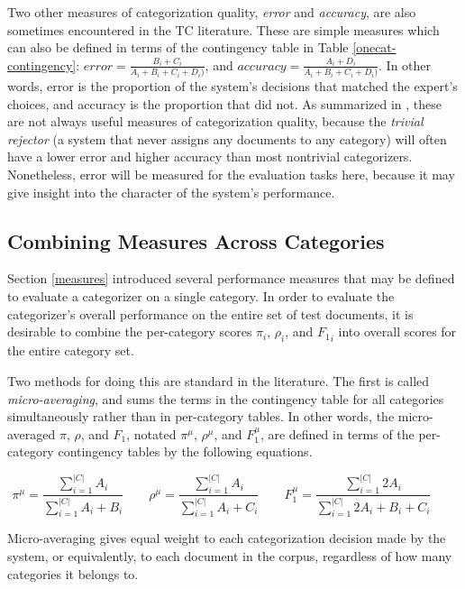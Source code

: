 Two other measures of categorization quality, \emph{error} and
\emph{accuracy}, are also sometimes encountered in the TC literature.
These are simple measures which can also be defined in terms of the
contingency table in Table \ref{onecat-contingency}: $error =
\frac{B_i+C_i}{A_i+B_i+C_i+D_i)}$, and $accuracy =
\frac{A_i+D_i}{A_i+B_i+C_i+D_i)}$.  In other words, error is the
proportion of the system's decisions that matched the expert's
choices, and accuracy is the proportion that did not.  As summarized
in \cite[p. 34]{sebastiani:02}, these are not always useful measures
of categorization quality, because the \emph{trivial rejector} (a
system that never assigns any documents to any category) will often
have a lower error and higher accuracy than most nontrivial
categorizers.  Nonetheless, error will be measured for the evaluation
tasks here, because it may give insight into the character of the
system's performance.


\subsection{Combining Measures Across Categories}
\label{combining-measures}

Section \ref{measures} introduced several performance measures that
may be defined to evaluate a categorizer on a single category.  In
order to evaluate the categorizer's overall performance on the entire
set of test documents, it is desirable to combine the per-category
scores $\pi_i$, $\rho_i$, and ${F_1}_i$ into overall scores for the
entire category set.

Two methods for doing this are standard in the literature.  The first
is called \emph{micro-averaging}, and sums the terms in the
contingency table for all categories simultaneously rather than in
per-category tables.  In other words, the micro-averaged $\pi$,
$\rho$, and $F_1$, notated $\pi^\mu$, $\rho^\mu$, and $F^\mu_1$, are
defined in terms of the per-category contingency tables by the
following equations.

\begin{displaymath}
 \pi^\mu = \frac{\sum_{i=1}^{|C|}{A_i}} {\sum_{i=1}^{|C|}{A_i+B_i}} \qquad
\rho^\mu = \frac{\sum_{i=1}^{|C|}{A_i}} {\sum_{i=1}^{|C|}{A_i+C_i}} \qquad
 F^\mu_1 = \frac{\sum_{i=1}^{|C|}{2 A_i}} {\sum_{i=1}^{|C|}{2 A_i+B_i+C_i}} \qquad
\end{displaymath}

Micro-averaging gives equal weight to each categorization decision
made by the system, or equivalently, to each document in the corpus,
regardless of how many categories it belongs to.

